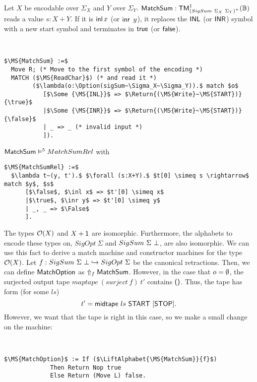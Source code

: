 Let $X$ be encodable over $\Sigma_X$ and $Y$ over $\Sigma_Y$.  $\MS{MatchSum} : \TM_{\left(SigSum~\Sigma_X~\Sigma_Y\right)^+}^1(\Bool)$ reads a value
$s:X+Y$.  If it is $\inl x$ (or $\inr~y$), it replaces the $\MS{INL}$ (or $\MS{INR}$) symbol with a new start symbol and terminates in $\true$ (or
$\false$).

\begin{definition}[$\MS{MatchSum}$]
  \label{def:MatchSum}
  ~
  \small
\begin{lstlisting}[style=semicoqstyle]
$\MS{MatchSum} :=$
  Move R; (* Move to the first symbol of the encoding *)
  MATCH ($\MS{ReadChar}$) (* and read it *)
        ($\lambda(o:\Option(sigSum~\Sigma_X~\Sigma_Y)).$ match $o$
           [$\Some {\MS{INL}}$ => $\Return{(\MS{Write}~\MS{START})}{\true}$
           |$\Some {\MS{INR}}$ => $\Return{(\MS{Write}~\MS{START})}{\false}$
           | _ => _ (* invalid input *)
           ]).
\end{lstlisting}
\end{definition}

\begin{lemma}
  \label{lem:MatchSum_Realise}
  $\MS{MatchSum} \vDash^5 MatchSumRel$ with
\begin{lstlisting}[style=semicoqstyle]
$\MS{MatchSumRel} :=$
  $\lambda t~(y, t').$ $\forall (s:X+Y).$ $t[0] \simeq s \rightarrow$ match $y$, $s$
      [$\false$, $\inl x$ => $t'[0] \simeq x$
      |$\true$, $\inr y$ => $t'[0] \simeq y$
      | _, _ => $\False$
      ].
\end{lstlisting}
\end{lemma}


The types $\Option(X)$ and $X+\Unit$ are isomorphic.  Furthermore, the alphabets to encode these types on, $SigOpt~\Sigma$ and $SigSum~\Sigma~\False$,
are also isomorphic.  We can use this fact to derive a match machine and constructor machines for the type $\Option(X)$.  Let
$f : SigSum~\Sigma~\False \hookrightarrow SigOpt~\Sigma$ be the canonical retractions.  Then, we can define $\MS{MatchOption}$ as
$\LiftAlphabet{\MS{MatchSum}}{f}$.  However, in the case that $o=\None$, the surjected output tape $maptape~(surject~f)~t'$ contains $\unit$.  Thus,
the tape has form (for some $ls$)
\[ t' = \MS{midtape}~ls~\MS{START}~[\MS{STOP}]. \] However, we want that the tape is right in this case, so we make a small change on the machine:

\begin{definition}[$\MS{MatchOption}$]
  \label{def:MatchOption}
  ~
\begin{lstlisting}[style=semicoqstyle]
$\MS{MatchOption}$ := If ($\LiftAlphabet{\MS{MatchSum}}{f}$)
             Then Return Nop true
             Else Return (Move L) false.
\end{lstlisting}
\end{definition}

